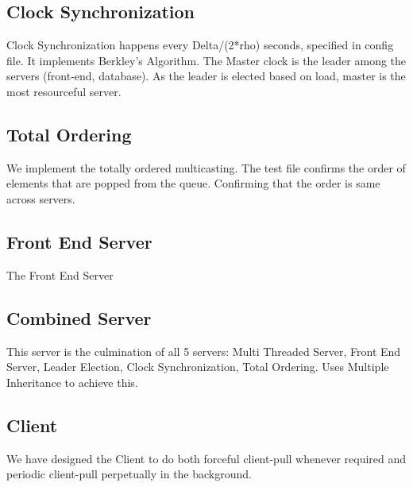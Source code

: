 \documentclass{article}
\begin{document}
\subsection{Clock Synchronization}
Clock Synchronization happens every Delta/(2*rho) seconds, specified in config file. It implements Berkley's Algorithm. The Master clock is the leader among the servers (front-end, database). As the leader is elected based on load, master is the most resourceful server.

\subsection{Total Ordering}
We implement the totally ordered multicasting. The test file confirms the order of elements that are popped from the queue. Confirming that the order is same across servers.


\subsection{Front End Server}
The Front End Server 

\subsection{Combined Server}
This server is the culmination of all 5 servers: Multi Threaded Server, 
Front End Server, Leader Election, Clock Synchronization, Total Ordering.
Uses Multiple Inheritance to achieve this.

\subsection{Client}
We have designed the Client to do both forceful client-pull whenever required and periodic client-pull perpetually in the background.
\end{document}
